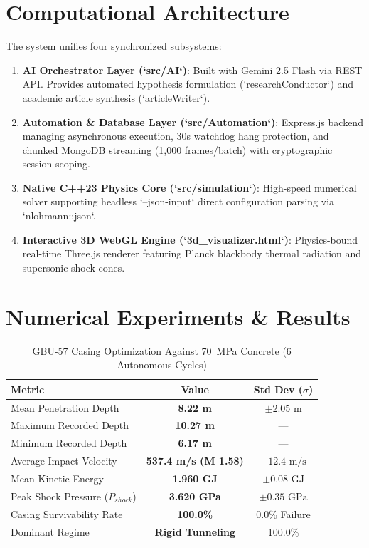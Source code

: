 \documentclass[journal,10pt,twocolumn]{IEEEtran}
\begin{document}
\section{Computational Architecture}
The system unifies four synchronized subsystems:
\begin{enumerate}
    \item \textbf{AI Orchestrator Layer (`src/AI`)}: Built with Gemini 2.5 Flash via REST API. Provides automated hypothesis formulation (`researchConductor`) and academic article synthesis (`articleWriter`).
    \item \textbf{Automation \& Database Layer (`src/Automation`)}: Express.js backend managing asynchronous execution, 30s watchdog hang protection, and chunked MongoDB streaming (1,000 frames/batch) with cryptographic session scoping.
    \item \textbf{Native C++23 Physics Core (`src/simulation`)}: High-speed numerical solver supporting headless `--json-input` direct configuration parsing via `nlohmann::json`.
    \item \textbf{Interactive 3D WebGL Engine (`3d_visualizer.html`)}: Physics-bound real-time Three.js renderer featuring Planck blackbody thermal radiation and supersonic shock cones.
\end{enumerate}

\section{Numerical Experiments \& Results}

\begin{table}[htbp]
\caption{GBU-57 Casing Optimization Against 70~MPa Concrete (6 Autonomous Cycles)}
\begin{center}
\begin{tabular}{lcc}
\toprule
\textbf{Metric} & \textbf{Value} & \textbf{Std Dev ($\sigma$)} \\
\midrule
Mean Penetration Depth & \textbf{8.22 m} & $\pm 2.05\text{ m}$ \\
Maximum Recorded Depth & \textbf{10.27 m} & --- \\
Minimum Recorded Depth & \textbf{6.17 m} & --- \\
Average Impact Velocity & \textbf{537.4 m/s (M 1.58)} & $\pm 12.4\text{ m/s}$ \\
Mean Kinetic Energy & \textbf{1.960 GJ} & $\pm 0.08\text{ GJ}$ \\
Peak Shock Pressure ($P_{shock}$) & \textbf{3.620 GPa} & $\pm 0.35\text{ GPa}$ \\
Casing Survivability Rate & \textbf{100.0\%} & 0.0\% Failure \\
Dominant Regime & \textbf{Rigid Tunneling} & 100.0\% \\
\bottomrule
\end{tabular}
\end{center}
\end{table}
\end{document}
